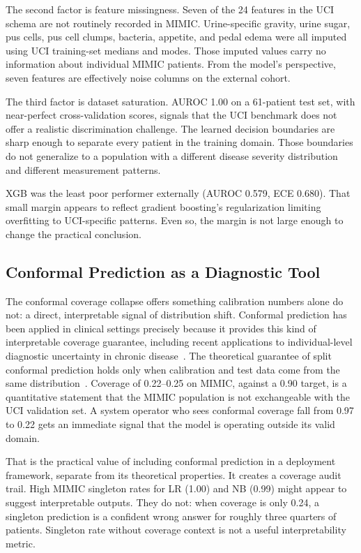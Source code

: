 The second factor is feature missingness. Seven of the 24 features in the UCI schema are not routinely recorded in MIMIC. Urine-specific gravity, urine sugar, pus cells, pus cell clumps, bacteria, appetite, and pedal edema were all imputed using UCI training-set medians and modes. Those imputed values carry no information about individual MIMIC patients. From the model's perspective, seven features are effectively noise columns on the external cohort.

The third factor is dataset saturation. AUROC 1.00 on a 61-patient test set, with near-perfect cross-validation scores, signals that the UCI benchmark does not offer a realistic discrimination challenge. The learned decision boundaries are sharp enough to separate every patient in the training domain. Those boundaries do not generalize to a population with a different disease severity distribution and different measurement patterns.

XGB was the least poor performer externally (AUROC 0.579, ECE 0.680). That small margin appears to reflect gradient boosting's regularization limiting overfitting to UCI-specific patterns. Even so, the margin is not large enough to change the practical conclusion.

\subsection{Conformal Prediction as a Diagnostic Tool}

The conformal coverage collapse offers something calibration numbers alone do not: a direct, interpretable signal of distribution shift. Conformal prediction has been applied in clinical settings precisely because it provides this kind of interpretable coverage guarantee, including recent applications to individual-level diagnostic uncertainty in chronic disease~\cite{Vazquez2022,Sreenivasan2025}. The theoretical guarantee of split conformal prediction holds only when calibration and test data come from the same distribution~\cite{AngelopoulosBates2022}. Coverage of 0.22--0.25 on MIMIC, against a 0.90 target, is a quantitative statement that the MIMIC population is not exchangeable with the UCI validation set. A system operator who sees conformal coverage fall from 0.97 to 0.22 gets an immediate signal that the model is operating outside its valid domain.

That is the practical value of including conformal prediction in a deployment framework, separate from its theoretical properties. It creates a coverage audit trail. High MIMIC singleton rates for LR (1.00) and NB (0.99) might appear to suggest interpretable outputs. They do not: when coverage is only 0.24, a singleton prediction is a confident wrong answer for roughly three quarters of patients. Singleton rate without coverage context is not a useful interpretability metric.

